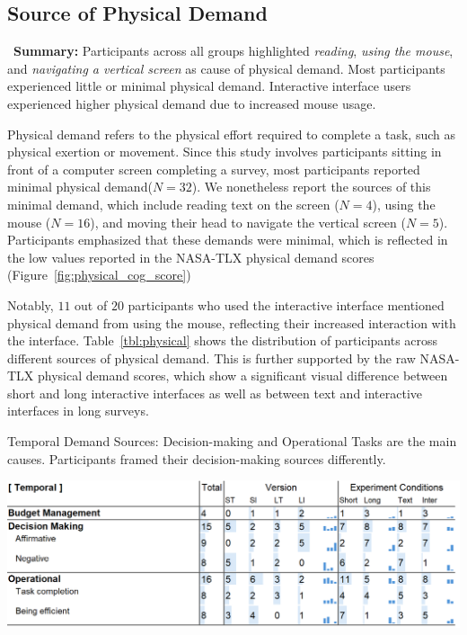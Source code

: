 \subsection{Source of Physical Demand} 
\label{sec:physical}

\vspace{5pt}
\begin{tldrbox}
    \faInfoCircle~\xspace\textbf{Summary:} Participants across all groups highlighted \textit{reading}, \textit{using the mouse}, and \textit{navigating a vertical screen} as cause of physical demand. Most participants experienced little or minimal physical demand. Interactive interface users experienced higher physical demand due to increased mouse usage.
\end{tldrbox}

Physical demand refers to the physical effort required to complete a task, such as physical exertion or movement. Since this study involves participants sitting in front of a computer screen completing a survey, most participants reported minimal physical demand($N=32$). We nonetheless report the sources of this minimal demand, which include reading text on the screen ($N=4$), using the mouse ($N=16$), and moving their head to navigate the vertical screen ($N=5$). Participants emphasized that these demands were minimal, which is reflected in the low values reported in the NASA-TLX physical demand scores (Figure~\ref{fig:physical_cog_score})

Notably, $11$ out of $20$ participants who used the interactive interface mentioned physical demand from using the mouse, reflecting their increased interaction with the interface. Table~\ref{tbl:physical} shows the distribution of participants across different sources of physical demand. This is further supported by the raw NASA-TLX physical demand scores, which show a significant visual difference between short and long interactive interfaces as well as between text and interactive interfaces in long surveys.

\begin{table}[h]
    \caption{Temporal Demand Sources: Decision-making and Operational Tasks are the main causes. Participants framed their decision-making sources differently.}
    \label{tbl:temporal}
    \includegraphics[width=\linewidth]{content/image/cog/temporal_table.png}
\end{table}

